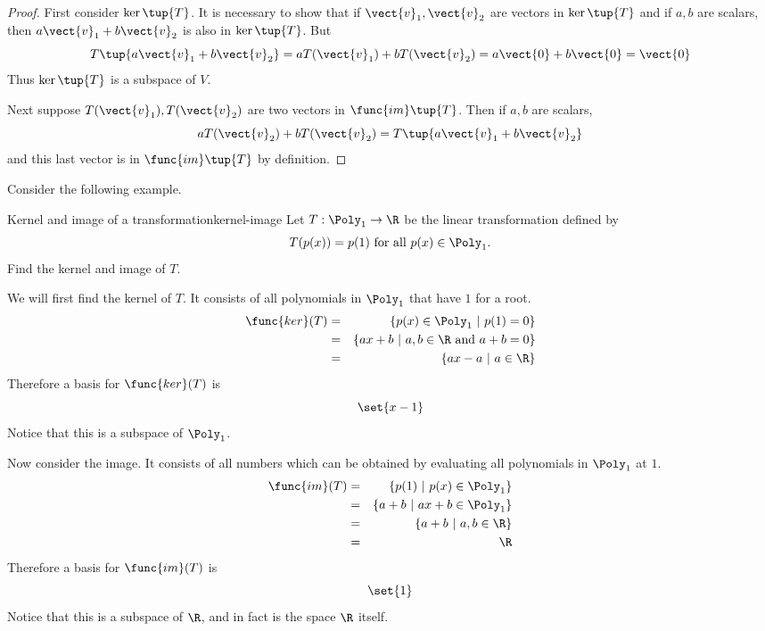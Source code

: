 \begin{proof}
First consider $\ker \tup{T} $. It is necessary to
show that if $\vect{v}_{1},\vect{v}_{2}$ are vectors in $\ker \tup{T} $
and if $a,b$ are scalars, then $a\vect{v}_{1}+b\vect{v}_{2}$ is also in $\ker
\tup{T} $. But 
\begin{equation*}
T\tup{a\vect{v}_{1}+b\vect{v}_{2}} =aT(\vect{v}_{1})+bT(\vect{v}_{2})=a\vect{0}+b\vect{0}=\vect{0}
\end{equation*}
Thus $\ker \tup{T} $ is a subspace of $V$.

Next suppose $T(\vect{v}_{1}),T(\vect{v}_{2})$ are two vectors in $\func{im}\tup{
T} $. Then if $a,b$ are scalars, 
\begin{equation*}
aT(\vect{v}_{2})+bT(\vect{v}_{2})=T\tup{a\vect{v}_{1}+b\vect{v}_{2}}
\end{equation*}
and this last vector is in $\func{im}\tup{T} $ by definition. 
\end{proof}

Consider the following example.

\begin{example}{Kernel and image of a transformation}{kernel-image}
Let $T:\Poly_1\to\R$ be the linear transformation defined by
\[ T(p(x))=p(1)\mbox{ for all } p(x)\in \Poly_1.\]
Find the kernel and image of $T$.
\end{example}

\begin{solution}
We will first find the kernel of $T$. It consists of all polynomials in $\Poly_1$ that have $1$ for a root. 
\begin{eqnarray*}
\func{ker}(T) & = & \{p(x)\in \Poly_1 ~|~ p(1)=0\} \\
& = & \{ax+b ~|~ a,b\in\R \mbox{ and }a+b=0\} \\
& = & \{ax-a ~|~ a\in\R\}
\end{eqnarray*}
Therefore a basis for $\func{ker}(T)$ is 
\[
\set{x-1 }
\]
Notice that this is a subspace of $\Poly_1$. 

Now consider the image. It consists of all numbers which can be obtained by evaluating all polynomials in $\Poly_1$ at $1$. 
\begin{eqnarray*}
\func{im}(T) & = & \{p(1) ~|~ p(x)\in \Poly_1\} \\
 & = & \{a+b ~|~ ax+b\in \Poly_1\} \\
 & = & \{a+b ~|~ a,b\in\R\}\\
 & = & \R
\end{eqnarray*}
Therefore a basis for $\func{im}(T)$ is 
\[
\set{1 }
\]
Notice that this is a subspace of $\R$, and in fact is the space $\R$ itself. 
\end{solution}


